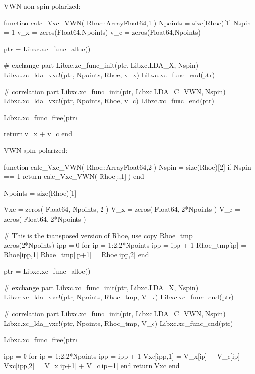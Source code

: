 VWN non-spin polarized:
\begin{juliacode}
function calc_Vxc_VWN( Rhoe::Array{Float64,1} )
    Npoints = size(Rhoe)[1]
    Nspin = 1
    v_x = zeros(Float64,Npoints)
    v_c = zeros(Float64,Npoints)

    ptr = Libxc.xc_func_alloc()

    # exchange part
    Libxc.xc_func_init(ptr, Libxc.LDA_X, Nspin)
    Libxc.xc_lda_vxc!(ptr, Npoints, Rhoe, v_x)
    Libxc.xc_func_end(ptr)

    # correlation part
    Libxc.xc_func_init(ptr, Libxc.LDA_C_VWN, Nspin)
    Libxc.xc_lda_vxc!(ptr, Npoints, Rhoe, v_c)
    Libxc.xc_func_end(ptr)

    Libxc.xc_func_free(ptr)

    return v_x + v_c
end
\end{juliacode}

VWN spin-polarized:
\begin{juliacode}
function calc_Vxc_VWN( Rhoe::Array{Float64,2} )
    Nspin = size(Rhoe)[2]
    if Nspin == 1
        return calc_Vxc_VWN( Rhoe[:,1] )
    end

    Npoints = size(Rhoe)[1]

    Vxc = zeros( Float64, Npoints, 2 )
    V_x = zeros( Float64, 2*Npoints )
    V_c = zeros( Float64, 2*Npoints )

    # This is the transposed version of Rhoe, use copy
    Rhoe_tmp = zeros(2*Npoints)
    ipp = 0
    for ip = 1:2:2*Npoints
        ipp = ipp + 1
        Rhoe_tmp[ip] = Rhoe[ipp,1]
        Rhoe_tmp[ip+1] = Rhoe[ipp,2]
    end

    ptr = Libxc.xc_func_alloc()

    # exchange part
    Libxc.xc_func_init(ptr, Libxc.LDA_X, Nspin)
    Libxc.xc_lda_vxc!(ptr, Npoints, Rhoe_tmp, V_x)
    Libxc.xc_func_end(ptr)

    # correlation part
    Libxc.xc_func_init(ptr, Libxc.LDA_C_VWN, Nspin)
    Libxc.xc_lda_vxc!(ptr, Npoints, Rhoe_tmp, V_c)
    Libxc.xc_func_end(ptr)

    Libxc.xc_func_free(ptr)

    ipp = 0
    for ip = 1:2:2*Npoints
        ipp = ipp + 1
        Vxc[ipp,1] = V_x[ip] + V_c[ip]
        Vxc[ipp,2] = V_x[ip+1] + V_c[ip+1]
    end
    return Vxc
end
\end{juliacode}


